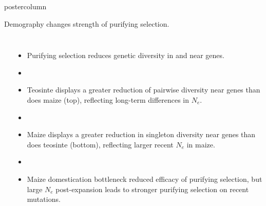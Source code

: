 \documentclass[final]{beamer}
\begin{document}
\begin{frame}
\begin{columns}
\begin{column}{.49\textwidth}
\begin{beamercolorbox}[center,wd=\textwidth]{postercolumn}
\begin{minipage}[T]{.95\textwidth}
{            \vfill
            \begin{block}{Demography changes strength of purifying selection.}
              \begin{columns}
              \centering
              \\
              \begin{itemize}
                \item Purifying selection reduces genetic diversity in
                  and near genes.
                \item[]
                \item Teosinte displays a greater reduction of pairwise diversity near
                  genes than does maize (top), reflecting long-term differences in $N_e$.
                \item[]
                \item Maize displays a greater reduction in singleton
                  diversity near genes than does teosinte (bottom), reflecting larger recent $N_e$ in maize.
                \item[]
                \item Maize domestication bottleneck reduced efficacy of purifying selection, but large $N_e$ post-expansion leads to stronger purifying selection on recent mutations.  %

\end{itemize}
\end{columns}
\end{block}}
\end{minipage}
\end{beamercolorbox}
\end{column}
\end{columns}
\end{frame}
\end{document}
